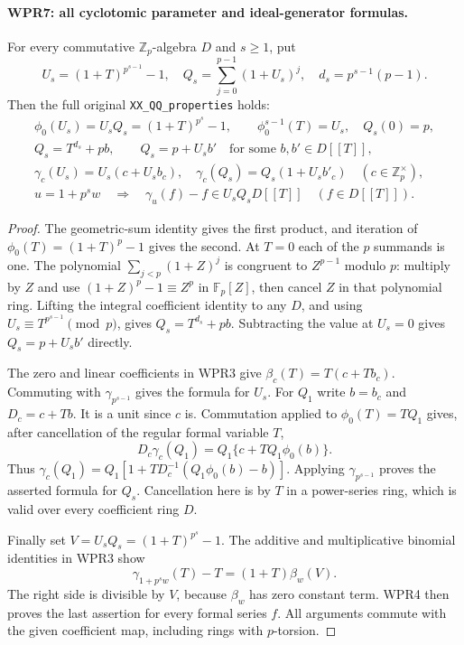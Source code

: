 \paragraph{WPR7: all cyclotomic parameter and ideal-generator formulas.}
\label{claim:WPR7}
For every commutative $\mathbb Z_p$-algebra $D$ and $s\geq1$, put
\[
 U_s=(1+T)^{p^{s-1}}-1,\quad
 Q_s=\sum_{j=0}^{p-1}(1+U_s)^j,\quad d_s=p^{s-1}(p-1).
 \tag{WPR.9}
\]
Then the full original \texttt{XX\_QQ\_properties} holds:
\[
 \begin{gathered}
 \phi_0(U_s)=U_sQ_s=(1+T)^{p^s}-1,
 \qquad \phi_0^{s-1}(T)=U_s,\quad Q_s(0)=p,\\
 Q_s=T^{d_s}+p b,\qquad Q_s=p+U_s b'
                    \quad\text{for some }b,b'\in D[[T]],\\
 \gamma_c(U_s)=U_s(c+U_s b_c),\quad
 \gamma_c(Q_s)=Q_s(1+U_s b'_c)\quad(c\in\mathbb Z_p^\times),\\
 u=1+p^s w\quad\Longrightarrow\quad
         \gamma_u(f)-f\in U_sQ_sD[[T]]\quad(f\in D[[T]]).
 \end{gathered}                                                     \tag{WPR.10}
\]

\begin{proof}
The geometric-sum identity gives the first product, and iteration
of $\phi_0(T)=(1+T)^p-1$ gives the second. At $T=0$ each of the
$p$ summands is one. The polynomial
$\sum_{j<p}(1+Z)^j$ is congruent to $Z^{p-1}$ modulo $p$:
multiply by $Z$ and use $(1+Z)^p-1\equiv Z^p$ in
$\mathbb F_p[Z]$, then cancel $Z$ in that polynomial ring.
Lifting the integral coefficient identity to any $D$, and using
$U_s\equiv T^{p^{s-1}}\pmod p$, gives
$Q_s=T^{d_s}+pb$. Subtracting the value at $U_s=0$ gives
$Q_s=p+U_sb'$ directly.

The zero and linear coefficients in WPR3 give
$\beta_c(T)=T(c+Tb_c)$. Commuting with $\gamma_{p^{s-1}}$
gives the formula for $U_s$. For $Q_1$ write $b=b_c$ and
$D_c=c+Tb$. It is a unit since $c$ is. Commutation applied to
$\phi_0(T)=TQ_1$ gives, after cancellation of the regular
formal variable $T$,
\[
 D_c\gamma_c(Q_1)=Q_1\{c+TQ_1\phi_0(b)\}.
\]
Thus
$\gamma_c(Q_1)=Q_1[1+TD_c^{-1}(Q_1\phi_0(b)-b)]$.
Applying $\gamma_{p^{s-1}}$ proves the asserted formula for
$Q_s$. Cancellation here is by $T$ in a power-series ring,
which is valid over every coefficient ring $D$.

Finally set $V=U_sQ_s=(1+T)^{p^s}-1$. The additive and
multiplicative binomial identities in WPR3 show
\[
 \gamma_{1+p^s w}(T)-T=(1+T)\beta_w(V).
\]
The right side is divisible by $V$, because $\beta_w$ has
zero constant term. WPR4 then proves the last assertion for
every formal series $f$. All arguments commute with the given
coefficient map, including rings with $p$-torsion.
\end{proof}

